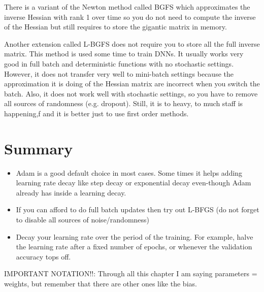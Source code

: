 There is a variant of the Newton method called BGFS which approximates the inverse Hessian with rank 1 over time so you do not need to compute the inverse of the Hessian but still requires to store the gigantic matrix in memory.

Another extension called L-BGFS does not require you to store all the full inverse matrix. This method is used some time to train DNNs. It usually works very good in full batch and deterministic functions with no stochastic settings. However, it does not transfer very well to mini-batch settings because the approximation it is doing of the Hessian matrix are incorrect when you switch the batch. Also, it does not work well with stochastic settings, so you have to remove all sources of randomness (e.g. dropout). Still, it is to heavy, to much staff is happening,f and it is better just to use first order methods.

\section*{Summary}
\begin{itemize}
\item Adam is a good default choice in most cases. Some times it helps adding learning rate decay like step decay or exponential decay even-though Adam already has inside a learning decay.
\item If you can afford to do full batch updates then try out L-BFGS (do not forget to disable all sources of noise/randomness)
\item Decay your learning rate over the period of the training. For example, halve the learning rate after a fixed number of epochs, or whenever the validation accuracy tops off.
\end{itemize}

IMPORTANT NOTATION!!: Through all this chapter I am saying parameters = weights, but remember that there are other ones like the bias.